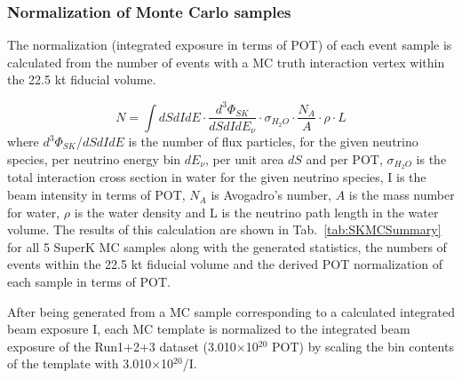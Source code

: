 \subsubsection {Normalization of Monte Carlo samples}
\label{sec:mc_templates:normalization}

The normalization (integrated exposure in terms of POT) of each event sample is calculated from
the number of events with a MC truth interaction vertex within the 22.5 kt fiducial volume.

\begin{equation}
\displaystyle
  N = \int  dS dI dE \cdot
            \frac{d^{3}\Phi_{SK}}{dS dI dE_{\nu}} \cdot
            \sigma_{H_{2}O} \cdot
            \frac{N_{A}}{A} \cdot \rho \cdot L 
\end{equation}
where 
$d^{3}\Phi_{SK}$/$dS dI dE$ is the number of flux particles, for the given neutrino species,
per neutrino energy bin $dE_{\nu}$, 
per unit area $dS$ 
and per POT,
$\sigma_{H_{2}O}$ is the total interaction cross section in water
for the given neutrino species,
I is the beam intensity in terms of POT,
$N_{A}$ is  Avogadro's number,
$A$ is the mass number for water,
$\rho$ is the water density
and L is the neutrino path length in the water volume.
The results of this calculation are shown in Tab.\ \ref{tab:SKMCSummary} for all 5 SuperK MC samples along with 
the generated statistics, the numbers of events within the 22.5 kt fiducial volume and the
derived POT normalization of each sample in terms of POT.

After being generated from a MC sample corresponding to a calculated integrated beam exposure I,
each MC template is normalized to the integrated beam exposure of the Run1+2+3 dataset (3.010$\times$10$^{20}$ POT)
by scaling the bin contents of the template with 3.010$\times$10$^{20}$/I.

